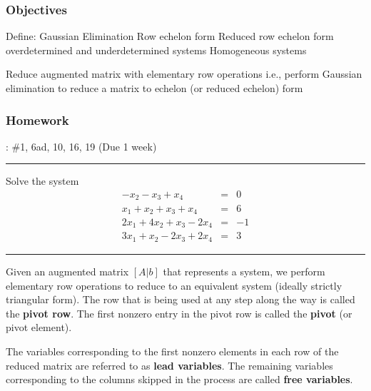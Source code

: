 

\subsubsection*{Objectives}
\begin{outline}
	\1 Define:
	    \2 Gaussian Elimination
	    \2 Row echelon form
	    \2 Reduced row echelon form
	    \2 overdetermined and underdetermined systems
	    \2 Homogeneous systems
    
    \1 Reduce augmented matrix with elementary row operations
        \2 i.e., perform Gaussian elimination to reduce a matrix to echelon (or reduced echelon) form 
\end{outline}


\subsubsection*{Homework}
: \#1, 6ad, 10, 16, 19 (Due 1 week)


\rule[0.01in]{\textwidth}{0.0025in}



\begin{example}Solve the system
\[
\begin{array}{rcr}
-x_2 - x_3 + x_4 & = & 0 \\
x_1 + x_2 + x_3 + x_4 & = & 6 \\
2 x_1 + 4x_2 + x_3 - 2 x_4 & = & -1 \\
3x_1 + x_2 - 2x_3 + 2x_4 & = & 3
\end{array}
\]
\end{example}


\rule[0.01in]{\textwidth}{0.0025in}





%
%





Given an augmented matrix $[A | b]$ that represents a system, we perform elementary row operations to reduce to an equivalent system (ideally strictly triangular form).  The row that is being used at any step along the way is called the {\color{blue}\textbf{pivot row}}.  The first nonzero entry in the pivot row is called the {\color{blue}\textbf{pivot}} (or pivot element).

The variables corresponding to the first nonzero elements in each row of the reduced matrix are referred to as {\color{blue}\textbf{lead variables}}.  The remaining variables corresponding to the columns skipped in the process are called {\color{blue}\textbf{free variables}}.

